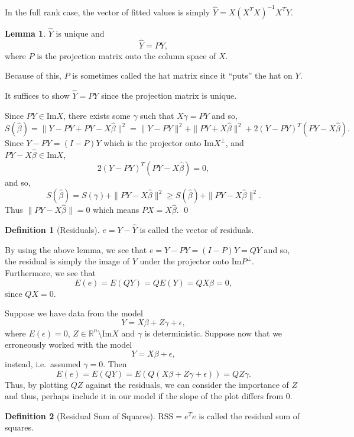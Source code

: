 \documentclass[
]{article}
\theoremstyle{definition}
\theoremstyle{definition}
\newtheorem{definition}{Definition}[section]
\newtheorem{lemma}{Lemma}[section]
\begin{document}
In the full rank case, the vector of fitted values is simply
\(\hat Y = X(X^T X)^{-1}X^T Y\).

\begin{lemma}
  \(\hat Y\) is unique and 
  \[\hat Y = P Y,\]
  where \(P\) is the projection matrix onto the column space of \(X\).
\end{lemma}

Because of this, \(P\) is sometimes called the hat matrix since it
``puts'' the hat on \(Y\).

\proof

It suffices to show \(\hat Y = P Y\) since the projection matrix is
unique.

Since \(P Y \in \text{Im} X\), there exists some \(\gamma\) such that
\(X \gamma = P Y\) and so,
\[S(\hat \beta) = \|Y - P Y + P Y - X \hat \beta\|^2 = 
    \|Y - P Y\|^2 + \|P Y + X \hat \beta\|^2 + 2(Y - PY)^T(PY - X\hat \beta).\]
Since \(Y - PY = (I - P)Y\) which is the projector onto
\(\text{Im} X^\perp\), and \(PY - X\hat \beta \in \text{Im} X\),
\[2(Y - PY)^T(PY - X\hat \beta) = 0,\] and so,
\[S(\hat \beta) = S(\gamma) + \|P Y - X\hat\beta\|^2 \ge 
    S(\hat \beta) + \|P Y - X\hat\beta\|^2.\] Thus
\(\|P Y - X\hat\beta\| = 0\) which means \(P X = X \hat \beta\). \qed

\begin{definition}[Residuals]
  \(e = Y - \hat Y\) is called the vector of residuals.
\end{definition}

By using the above lemma, we see that \(e = Y - PY = (I - P) Y = Q Y\)
and so, the residual is simply the image of \(Y\) under the projector
onto \(\text{Im}P^\perp\). Furthermore, we see that
\[E(e) = E(QY) = Q E(Y) = Q X \beta = 0,\] since \(QX = 0\).

Suppose we have data from the model
\[Y = X \beta + Z \gamma + \epsilon,\] where \(E(\epsilon) = 0\),
\(Z \in \mathbb{R}^n \setminus \text{Im}X\) and \(\gamma\) is
deterministic. Suppose now that we erroneously worked with the model
\[Y = X\beta + \epsilon,\] instead, i.e.~assumed \(\gamma = 0\). Then
\[E(e) = E(QY) = E(Q(X \beta + Z \gamma + \epsilon)) = QZ \gamma.\]
Thus, by plotting \(QZ\) against the residuals, we can consider the
importance of \(Z\) and thus, perhaps include it in our model if the
slope of the plot differs from 0.

\begin{definition}[Residual Sum of Squares]
  \(\text{RSS} = e^T e\) is called the residual sum of squares.
\end{definition}
\end{document}
